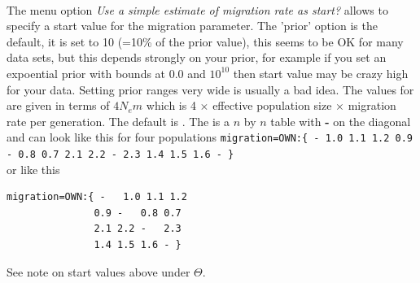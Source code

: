 \begin{description}
\item{\\
The menu option \textsl{Use a simple estimate of migration rate as start?} allows to specify a start value for the migration parameter. 
The 'prior' option is the default, it is set to 10 (=10\% of the prior value), this seems to be OK for many data sets, but this depends strongly on your prior, for example if you set an expoential prior with bounds at $0.0$ and $10^10$ then start value may be crazy high for your data. Setting prior ranges very wide is usually a bad idea.
The values for {} are given in terms of $4N_em$ which is 4 $\times$ effective population size $\times$ migration rate per generation.
The default is . 
The  is a $n$ by $n$ table with {\bf -} on the diagonal and can look 
like this for four populations
{\tt migration=OWN:\{ - 1.0 1.1 1.2 0.9 - 0.8 0.7 2.1 2.2 - 2.3 1.4 1.5 1.6 - \}}\\
or like this
\begin{tt}
\begin{verbatim}
migration=OWN:{ -   1.0 1.1 1.2 
               0.9 -   0.8 0.7 
               2.1 2.2 -   2.3
               1.4 1.5 1.6 - }
\end{verbatim}
\end{tt}
See note on start values above under $\Theta$.}
\end{description}


